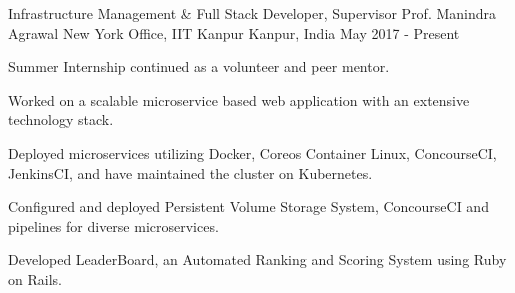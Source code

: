 \begin{cventries}

  \cventry
    {Infrastructure Management \& Full Stack Developer, Supervisor Prof. Manindra Agrawal} %
    {New York Office, IIT Kanpur} %
    {Kanpur, India} %
    {May 2017 - Present} %
    {
      \begin{cvitems} %
        \item {Summer Internship continued as a volunteer and peer mentor.}
        \item {Worked on a scalable microservice based web application with an extensive technology stack.}
        \item {Deployed microservices utilizing Docker, Coreos Container Linux, ConcourseCI, JenkinsCI, and have maintained the cluster on Kubernetes.}
        \item {Configured and deployed Persistent Volume Storage System, ConcourseCI and pipelines for diverse microservices.}
        \item {Developed LeaderBoard, an Automated Ranking and Scoring System using Ruby on Rails.}
      \end{cvitems}
    }

\end{cventries}
